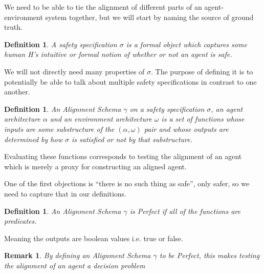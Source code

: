 \documentclass[12pt]{article}
\newtheorem{mydef}[thm]{Definition}
\newtheorem{rem}[thm]{Remark}
\begin{document}
We need to be able to tie the alignment of different parts of an agent-environment system together, but we will start by naming the source of ground truth.
\begin{mydef}A safety specification $\sigma$ is a formal object which captures some human H's intuitive or formal notion of whether or not an agent is safe.
\end{mydef}
We will not directly need many properties of $\sigma$. The purpose of defining it is to potentially be able to talk about multiple safety specifications in contrast to one another.
\begin{mydef} An Alignment Schema $\gamma$ on a safety specification $\sigma$, an agent architecture $\alpha$ and an environment architecture $\omega$ is a set of functions whose inputs are some substructure of the $( \alpha, \omega )$ pair and whose outputs are determined by how $\sigma$ is satisfied or not by that substructure.
\end{mydef} Evaluating these functions corresponds to testing the alignment of an agent which is merely a proxy for constructing an aligned agent.

One of the first objections is ``there is no such thing as safe'', only safer, so we need to capture that in our definitions.
\begin{mydef} An Alignment Schema $\gamma$ is Perfect if all of the functions are predicates. \end{mydef}
Meaning the outputs are boolean values i.e. true or false. 
\begin{rem} By defining an Alignment Schema $\gamma$ to be Perfect, this makes testing the alignment of an agent a decision problem \end{rem}
\end{document}
